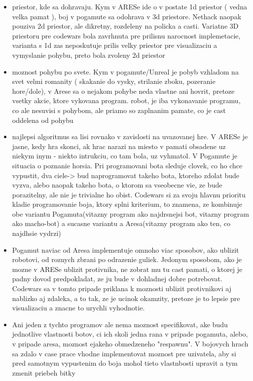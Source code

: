 \documentclass[12pt,notitlepage]{report}
\begin{document}
\begin{itemize}
\item priestor, kde sa dohravaju. Kym v ARESe ide o v postate 1d priestor ( vedna velka pamat ), boj v pogamute sa odohrava v 3d priestore. Nethack naopak pouziva 2d priestor, ale dikretny, rozdeleny na policka a casti. Variatne 3D priestoru pre codewars bola zavrhnuta pre prilisnu narocnost implemetacie, varianta s 1d zas neposkutuje prilis velky priestor pre visualizaciu a vymyslanie pohybu, preto bola zvoleny 2d priestor
\item moznost pohybu po svete. Kym v pogamute/Unreal je pobyb vzhladom na svet velmi romanity ( skakanie do vysky, strilanie zboku, pozeranie hore/dole), v Arese sa o nejakom pohybe neda vlastne ani hovrit, pretoze vsetky akcie, ktore vykovana program. robot, je iba vykonavanie programu, co ale nesuvisi s pohybom, ale priamo so zaplnanim pamate, co je cast oddelena od pohybu
\item najlepsi algoritmus sa lisi rovnako v zavislosti na uvazovanej hre. V ARESe je jasne, kedy hra skonci, ak hrac narazi na miesto v pamati obsadene uz niekym inym - niekto intrukciu, co tam bola, uz vyhmatol. V Pogamute je situacia o poznanie horsia. Pri programovani bota sleduje clovek, co ho chce vypustit, dva ciele-> bud naprogramovat takeho bota, ktoreho zdolat bude vyzva, alebo naopak takeho bota, o ktorom sa vseobecne vie, ze bude porazitelny, ale nie je trivialne ho obist. Codewars si za svoju hlavnu prioritu kladie programovanie boja, ktory splni kriterium, to znamena, ze kombinuje obe variantu Pogamuta(vitazny program ako najdrsnejsi bot, vitazny program ako macho-bot) a sucasne variantu a Aresa(vitazny program ako ten, co najdhsie vydrzi)
\item Pogamut naviac od Aresa implementuje omnoho viac sposobov, ako ublizit robotovi, od roznych zbrani po odrazenie guliek. Jedonym sposobom, ako je mozne v ARESe ublizit protivnika, ne zobrat mu tu cast pamati, o ktorej je padny dovod predpokladat, ze ju bude v dohladnej dobre potrebovat. Codewars sa v tomto pripade priklana k moznosti ublizit protivnikovi aj nablizko aj zdaleka, a to tak, ze je ucinok okamzity, pretoze je to lepsie pre visualizaciu a znacne to urychli vyhodnotie.
\item Ani jeden z tychto programov ale nema moznost specifikovat, ake budu jednotlive vlastnosti botov, ci ich skoli jedna rana v pripade pogamuta, alebo, v pripade aresa, moznost ejakeho obmedzeneho "respawnu". V bojovych hrach sa zdalo v case prace vhodne implementovat moznost pre uzivatela, aby si pred samotnym vypustenim do boja mohol tieto vlastnbosti upravit a tym zmenit priebeh bitky

\end{itemize}
\end{document}
